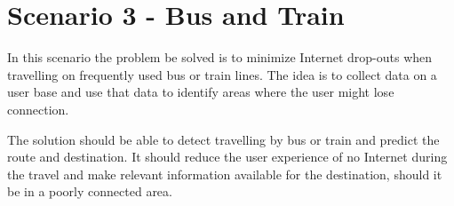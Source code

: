 \section{Scenario 3 - Bus and Train}
In this scenario the problem be solved is to minimize Internet drop-outs when travelling on frequently used bus or train lines. The idea is to collect data on a user base and use that data to identify areas where the user might lose connection.

The solution should be able to detect travelling by bus or train and predict the route and destination. It should reduce the user experience of no Internet during the travel and make relevant information available for the destination, should it be in a poorly connected area.

